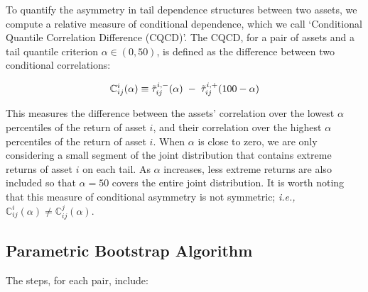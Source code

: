 \documentclass{article}
\begin{document}
To quantify the asymmetry in tail dependence structures between two assets, we compute a relative measure of conditional dependence, which we call `Conditional Quantile Correlation Difference (CQCD)'. The CQCD, for a pair of assets and a tail quantile criterion $\alpha \in (0, 50)$, is defined as the difference between two conditional correlations:

\vspace{-3mm}
\begin{align}\label{def3}
\mathbb{C}^i_{ij}(\alpha) \equiv \tilde{\tau}^{i,-}_{ij}(\alpha) \hspace{1mm} - \hspace{1mm} \tilde{\tau}^{i,+}_{ij}(100-\alpha)
\end{align}

This measures the difference between the assets' correlation over the lowest $\alpha$ percentiles of the return of asset $i$, and their correlation over the highest $\alpha$ percentiles of the return of asset $i$. When $\alpha$ is close to zero, we are only considering a small segment of the joint distribution that contains extreme returns of asset $i$ on each tail. As $\alpha$ increases, less extreme returns are also included so that $\alpha = 50$ covers the entire joint distribution. It is worth noting that this measure of conditional asymmetry is not symmetric; \textit{i.e.,} $\mathbb{C}^i_{ij} (\alpha) \neq \mathbb{C}^j_{ij}(\alpha)$. 


\subsection{Parametric Bootstrap Algorithm}\label{sec:boot}

The steps, for each pair, include: 
\end{document}
